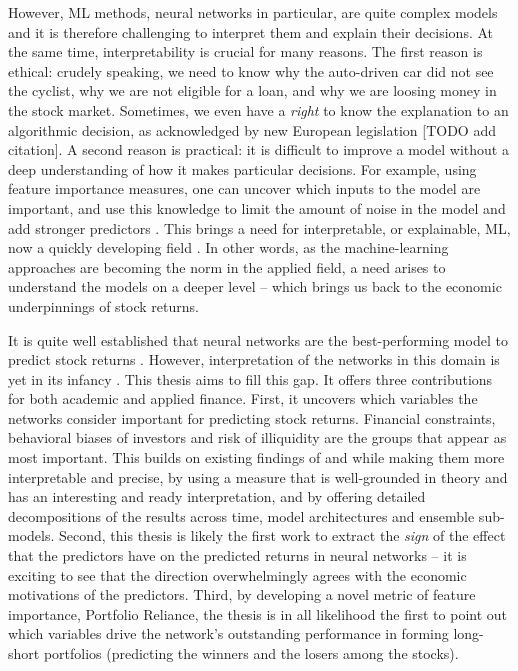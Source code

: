 However, ML methods, neural networks in particular, are quite complex models and it is therefore challenging to interpret them and explain their decisions. At the same time, interpretability is crucial for many reasons. The first reason is ethical: crudely speaking, we need to know why the auto-driven car did not see the cyclist, why we are not eligible for a loan, and why we are loosing money in the stock market. Sometimes, we even have a \textit{right} to know the explanation to an algorithmic decision, as acknowledged by new European legislation [TODO add citation]. A second reason is practical: it is difficult to improve a model without a deep understanding of how it makes particular decisions. For example, using feature importance measures, one can uncover which inputs to the model are important, and use this knowledge to limit the amount of noise in the model and add stronger predictors \citep{de2018advances}. This brings a need for interpretable, or explainable, ML, now a quickly developing field \citep{molnar2020interpretable}. In other words, as the machine-learning approaches are becoming the norm in the applied field, a need arises to understand the models on a deeper level – which brings us back to the economic underpinnings of stock returns.

It is quite well established that neural networks are the best-performing model to predict stock returns  \citep{gu2020empirical}. However, interpretation of the networks in this domain is yet in its infancy \citep{gu2020empirical}. This thesis aims to fill this gap. It offers three contributions for both academic and applied finance. First, it uncovers which variables the networks consider important for predicting stock returns. Financial constraints, behavioral biases of investors and risk of illiquidity are the groups that appear as most important. This builds on existing findings of \cite{gu2020empirical} and \cite{tobek2020does} while making them more interpretable and precise, by using a measure that is well-grounded in theory and has an interesting and ready interpretation, and by offering detailed decompositions of the results across time, model architectures and ensemble sub-models. Second, this thesis is likely the first work to extract the \textit{sign} of the effect that the predictors have on the predicted returns in neural networks -- it is exciting to see that the direction overwhelmingly agrees with the economic motivations of the predictors. Third, by developing a novel metric of feature importance, Portfolio Reliance, the thesis is in all likelihood the first to point out which variables drive the network's outstanding performance in forming long-short portfolios (predicting the winners and the losers among the stocks). 

